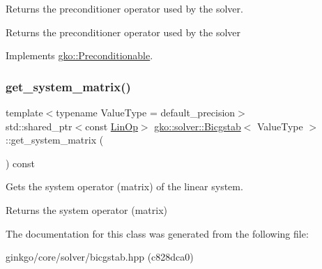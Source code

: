 Returns the preconditioner operator used by the solver. 

\begin{DoxyReturn}{Returns}
the preconditioner operator used by the solver 
\end{DoxyReturn}


Implements \hyperlink{classgko_1_1Preconditionable_ad9545089aef0dfc83bc7a74e5bf1d748}{gko\+::\+Preconditionable}.

\mbox{\label{classgko_1_1solver_1_1Bicgstab_ada73e8ca3e8924011c8780cab92f651e}} 
\subsubsection{\texorpdfstring{get\+\_\+system\+\_\+matrix()}{get\_system\_matrix()}}
{\footnotesize\ttfamily template$<$typename Value\+Type  = default\+\_\+precision$>$ \\
std\+::shared\+\_\+ptr$<$const \hyperlink{classgko_1_1LinOp}{Lin\+Op}$>$ \hyperlink{classgko_1_1solver_1_1Bicgstab}{gko\+::solver\+::\+Bicgstab}$<$ Value\+Type $>$\+::get\+\_\+system\+\_\+matrix (\begin{DoxyParamCaption}{ }\end{DoxyParamCaption}) const}



Gets the system operator (matrix) of the linear system. 

\begin{DoxyReturn}{Returns}
the system operator (matrix) 
\end{DoxyReturn}


The documentation for this class was generated from the following file\+:\begin{DoxyCompactItemize}
\item 
ginkgo/core/solver/bicgstab.\+hpp (c828dca0)\end{DoxyCompactItemize}
